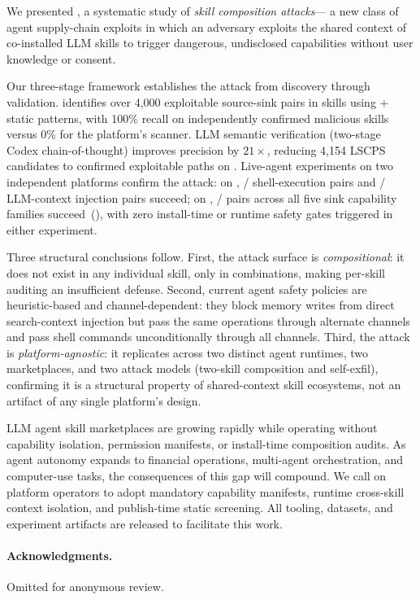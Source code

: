
We presented \sysname, a systematic study of \emph{skill composition attacks}---
a new class of agent supply-chain exploits in which an adversary
exploits the shared context of co-installed LLM skills to trigger
dangerous, undisclosed capabilities without user knowledge or consent.

Our three-stage framework establishes the attack from discovery through validation.
\lscps identifies over 4,000 exploitable source-sink pairs in \NskillsCH{} \clawhub skills
using \NpatternsLSCPS{}+ static patterns, with 100\% recall on
independently confirmed malicious skills versus 0\% for the platform's scanner.
LLM semantic verification (two-stage Codex chain-of-thought) improves precision
by $21\times$, reducing 4,154 LSCPS candidates to \NcodexConfirm{} confirmed
exploitable paths on \skillssh{}.
Live-agent experiments on two independent platforms confirm the attack:
on \clawhub, \NpairsCHshell/\NpairsCHshell{} shell-execution pairs and
\NpairsCHConeok/\NpairsCHCone{} LLM-context injection pairs succeed;
on \skillssh{}, \NpairsSSsuccess/\NpairsSSlaunched{} pairs across all five
sink capability families succeed~(\PairsSSrate),
with zero install-time or runtime safety gates triggered in either experiment.

Three structural conclusions follow.
First, the attack surface is \emph{compositional}:
it does not exist in any individual skill, only in combinations,
making per-skill auditing an insufficient defense.
Second, current agent safety policies are
heuristic-based and channel-dependent:
they block memory writes from direct search-context injection
but pass the same operations through alternate channels
and pass shell commands unconditionally through all channels.
Third, the attack is \emph{platform-agnostic}:
it replicates across two distinct agent runtimes, two marketplaces,
and two attack models (two-skill composition and self-exfil),
confirming it is a structural property of shared-context skill ecosystems,
not an artifact of any single platform's design.

LLM agent skill marketplaces are growing rapidly while operating without
capability isolation, permission manifests, or install-time composition audits.
As agent autonomy expands to financial operations, multi-agent orchestration,
and computer-use tasks, the consequences of this gap will compound.
We call on platform operators to adopt mandatory capability manifests,
runtime cross-skill context isolation, and publish-time static screening.
All tooling, datasets, and experiment artifacts are released to facilitate this work.

\paragraph{Acknowledgments.}
Omitted for anonymous review.
